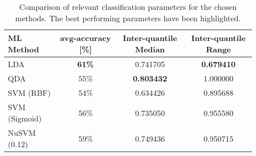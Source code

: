 \documentclass[../main.tex]{subfiles}
\begin{document}
\begin{table}[H]
\begin{center}
\begin{tabular}{ |l|c|c|c| } 
 \hline
 ML Method & avg-accuracy [\%] & Inter-quantile Median & Inter-quantile Range \\ 
 \hline
 LDA & \textbf{61\%}           & 0.741705 & \textbf{0.679410} \\ 
 QDA & 55\%           & \textbf{0.803432} & 1.000000 \\ 
 SVM (RBF) & 54\%     & 0.634426 & 0.895688 \\ 
 SVM (Sigmoid) & 56\% & 0.735050 & 0.955580 \\ 
 NuSVM (0.12) & 59\%  & 0.749436 & 0.950715 \\ 
 \hline
\end{tabular}
\caption{Comparison of relevant classification parameters for the chosen methods. The best performing parameters have been highlighted.}
\label{tab:classification_comparison}
\end{center}
\end{table}

\end{document}
